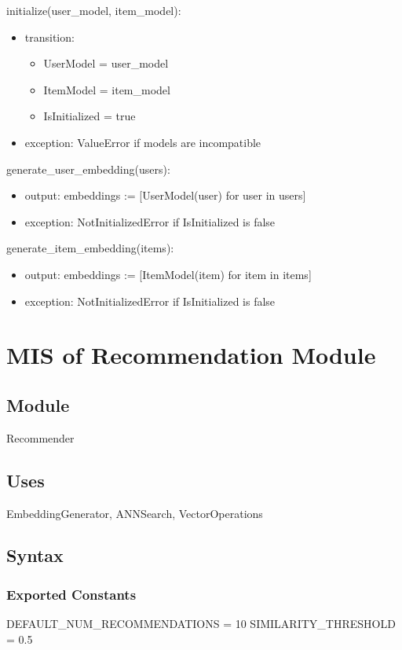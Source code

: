 \documentclass[12pt, titlepage]{article}
\begin{document}
\noindent initialize(user\_model, item\_model):
\begin{itemize}
\item transition:
  \begin{itemize}
    \item UserModel = user\_model
    \item ItemModel = item\_model
    \item IsInitialized = true
  \end{itemize}
\item exception: ValueError if models are incompatible
\end{itemize}

\noindent generate\_user\_embedding(users):
\begin{itemize}
\item output: embeddings := [UserModel(user) for user in users]
\item exception: NotInitializedError if IsInitialized is false
\end{itemize}


\noindent generate\_item\_embedding(items):
\begin{itemize}
\item output: embeddings := [ItemModel(item) for item in items]
\item exception: NotInitializedError if IsInitialized is false
\end{itemize}


\section{MIS of Recommendation Module } \label{ModuleR}

\subsection{Module}

Recommender

\subsection{Uses}
EmbeddingGenerator, ANNSearch, VectorOperations

\subsection{Syntax}

\subsubsection{Exported Constants}
DEFAULT\_NUM\_RECOMMENDATIONS = 10
SIMILARITY\_THRESHOLD = 0.5
\end{document}
